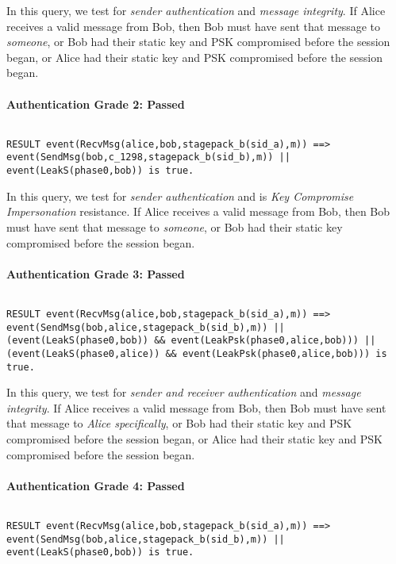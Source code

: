 In this query, we test for \emph{sender authentication} and \emph{message integrity}. If Alice receives a valid message from Bob, then Bob must have sent that message to \emph{someone}, or Bob had their static key and PSK compromised before the session began, or Alice had their static key and PSK compromised before the session began.


\paragraph{Authentication Grade 2: Passed}$ $
\begin{lstlisting}
RESULT event(RecvMsg(alice,bob,stagepack_b(sid_a),m)) ==> event(SendMsg(bob,c_1298,stagepack_b(sid_b),m)) || event(LeakS(phase0,bob)) is true.
\end{lstlisting}

In this query, we test for \emph{sender authentication} and is \emph{Key Compromise Impersonation} resistance. If Alice receives a valid message from Bob, then Bob must have sent that message to \emph{someone}, or Bob had their static key compromised before the session began.


\paragraph{Authentication Grade 3: Passed}$ $
\begin{lstlisting}
RESULT event(RecvMsg(alice,bob,stagepack_b(sid_a),m)) ==> event(SendMsg(bob,alice,stagepack_b(sid_b),m)) || (event(LeakS(phase0,bob)) && event(LeakPsk(phase0,alice,bob))) || (event(LeakS(phase0,alice)) && event(LeakPsk(phase0,alice,bob))) is true.
\end{lstlisting}

In this query, we test for \emph{sender and receiver authentication} and \emph{message integrity}. If Alice receives a valid message from Bob, then Bob must have sent that message to \emph{Alice specifically}, or Bob had their static key and PSK compromised before the session began, or Alice had their static key and PSK compromised before the session began.


\paragraph{Authentication Grade 4: Passed}$ $
\begin{lstlisting}
RESULT event(RecvMsg(alice,bob,stagepack_b(sid_a),m)) ==> event(SendMsg(bob,alice,stagepack_b(sid_b),m)) || event(LeakS(phase0,bob)) is true.
\end{lstlisting}

